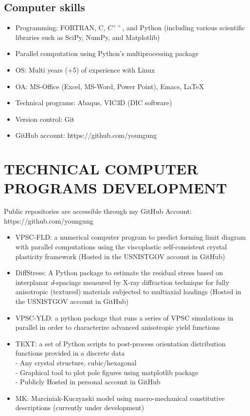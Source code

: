 \documentclass{res}
\begin{document}
\begin{resume}
  \subsection{Computer skills}
  \begin{itemize}
  \item Programming: FORTRAN, C, $C^{++}$, and Python (including various scientific libraries such as SciPy, NumPy, and Matplotlib)
  \item Parallel computation using Python's multiprocessing package
  \item OS: Multi years (+5) of experience with Linux
  \item OA: MS-Office (Excel, MS-Word, Power Point), Emacs, \LaTeX
  \item Technical programs: Abaqus, VIC3D (DIC software)
  \item Version control: Git
  \item GitHub account: https://github.com/youngung
  \end{itemize}

  \section{TECHNICAL COMPUTER PROGRAMS DEVELOPMENT}
  Public repositories are accessible through my GitHub Account: https://github.com/youngung
  \begin{itemize}
  \item VPSC-FLD: a numerical computer program to predict forming limit diagram with parallel computations using the viscoplastic self-consistent crystal plasticity framework (Hosted in the USNISTGOV account in GitHub) \\
  \item DiffStress: A Python package to estimate the residual stress based on interplanar \emph{d}-spacings measured by X-ray diffraction technique for fully anisotropic (textured) materials subjected to multiaxial loadings (Hosted in the USNISTGOV account in GitHub) \\
  \item VPSC-YLD: a python package that runs a series of VPSC simulations in parallel in order to characterize advanced anisotropic yield functions \\
  \item TEXT: a set of Python scripts to post-process orientation distribution functions provided in a discrete data \\
    - Any crystal structure, cubic/hexagonal\\
    - Graphical tool to plot pole figures using matplotlib package\\
    - Publicly Hosted in personal account in GitHub\\
  \item MK: Marciniak-Kuczynski model using macro-mechanical constitutive descriptions (currently under development)
  \end{itemize}


\end{resume}
\end{document}
